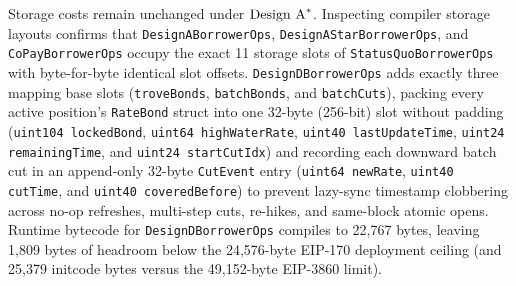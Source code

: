 Storage costs remain unchanged under $\textup{Design A}^*$. Inspecting compiler storage layouts confirms that \texttt{DesignA\allowbreak BorrowerOps}, \texttt{DesignAStar\allowbreak BorrowerOps}, and \texttt{CoPay\allowbreak BorrowerOps} occupy the exact 11 storage slots of \texttt{StatusQuo\allowbreak BorrowerOps} with byte-for-byte identical slot offsets. \texttt{DesignD\allowbreak BorrowerOps} adds exactly three mapping base slots (\texttt{troveBonds}, \texttt{batchBonds}, and \texttt{batchCuts}), packing every active position's \texttt{RateBond} struct into one 32-byte (256-bit) slot without padding ({\small\texttt{uint104 lockedBond}}, {\small\texttt{uint64 highWaterRate}}, {\small\texttt{uint40 lastUpdateTime}}, {\small\texttt{uint24 remainingTime}}, and {\small\texttt{uint24 startCutIdx}}) and recording each downward batch cut in an append-only 32-byte \texttt{CutEvent} entry ({\small\texttt{uint64 newRate}}, {\small\texttt{uint40 cutTime}}, and {\small\texttt{uint40 coveredBefore}}) to prevent lazy-sync timestamp clobbering across no-op refreshes, multi-step cuts, re-hikes, and same-block atomic opens. Runtime bytecode for \texttt{DesignD\allowbreak BorrowerOps} compiles to 22,767 bytes, leaving 1,809 bytes of headroom below the 24,576-byte EIP-170 deployment ceiling (and 25,379 initcode bytes versus the 49,152-byte EIP-3860 limit).

